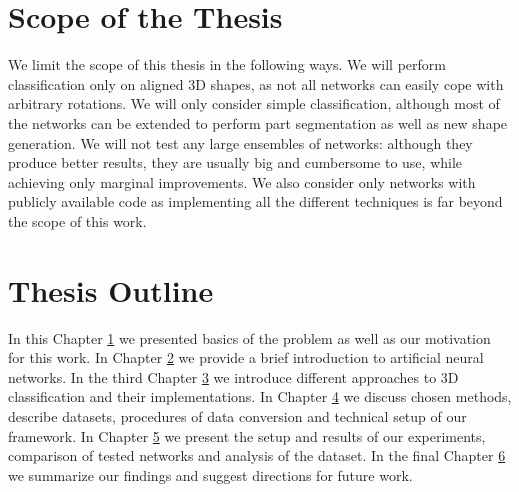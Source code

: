 \section{Scope of the Thesis}
We limit the scope of this thesis in the following ways. We will perform classification only on aligned 3D shapes, as not all networks can easily cope with arbitrary rotations. We will only consider simple classification, although most of the networks can be extended to perform part segmentation as well as new shape generation. We will not test any large ensembles of networks: although they produce better results, they are usually big and cumbersome to use, while achieving only marginal improvements. We also consider only networks with publicly available code as implementing all the different techniques is far beyond the scope of this work.

\section{Thesis Outline}
In this Chapter \hyperref[sec:chap1]{1} we presented basics of the problem as well as our motivation for this work. In Chapter \hyperref[sec:chap2]{2} we provide a brief introduction to artificial neural networks. In the third Chapter \hyperref[sec:chap3]{3} we introduce different approaches to 3D classification and their implementations. In Chapter \hyperref[sec:chap4]{4} we discuss chosen methods, describe datasets, procedures of data conversion and technical setup of our framework. In Chapter \hyperref[sec:chap5]{5} we present the setup and results of our experiments, comparison of tested networks and analysis of the dataset. In the final Chapter \hyperref[sec:chap6]{6} we summarize our findings and suggest directions for future work.
